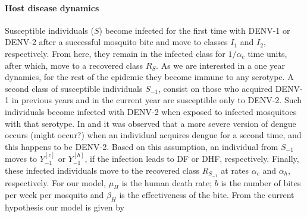     \paragraph{Host disease dynamics}
        Susceptible individuals ($S$) become infected for the first time
        with DENV-1 or DENV-2 after  a successful mosquito bite and move
        to classes $I_1$ and $I_2$, respectively. From here, they remain
        in the infected class for $1/\alpha_c$ time units, after which,
        move to a recovered class $R_S$.  As we are interested in a one
        year dynamics, for the rest of the epidemic they become immune to
        any serotype. A second class of susceptible individuals $S_{-1}$,
        consist on those who acquired DENV-1 in previous years and in the
        current year are susceptible only to DENV-2. Such individuals
        become infected with DENV-2 when exposed to infected mosquitoes
        with that serotype. In \cite{OhAinle2011} and
        \cite{Sangkawibha1984} it was observed that a more severe version
        of dengue occurs (might occur?) when an individual acquires dengue
        for a second time, and this happens to be DENV-2. Based on this
        assumption, an individual from $S_{-1}$ moves to $Y_{-1}^{[c]}$ or
        $Y_{-1}^{[h]}$, if the infection leads to DF or DHF, respectively.
        Finally, these infected individuals move to the recovered class
        $R_{S_{-1}}$ at rates $\alpha_c$ and $\alpha_h$, respectively. For
        our model, $\mu_H$ is the human death rate; $b$ is the number of
        bites per week per mosquito and $\beta_H$ is the effectiveness of
        the bite. From the current hypothesis our model is given by    


